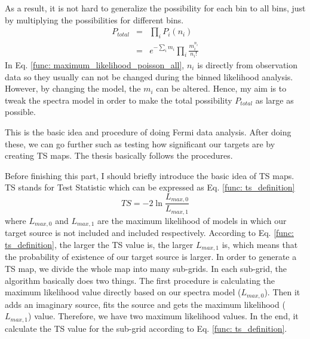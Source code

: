 \documentclass[12pt]{report}
\begin{document}
          As a result, it is not hard to generalize the possibility for each bin to all bins, 
          just by multiplying the possibilities for different bins.
          \begin{eqnarray}
            P_{total} &=& \prod_{i}^{}P_{i}\left(n_{i}\right) \nonumber \\ 
                      &=& e^{-\sum_{i}^{}m_i}\prod_{i}^{}\frac{m_{i}^{n_i}}{n_i!}
            \label{func: maximum_likelihood_poisson_all}
          \end{eqnarray}
          In Eq. \ref{func: maximum_likelihood_poisson_all}, $n_i$ is directly 
          from observation data so they usually can not be changed during the binned likelihood 
          analysis. However, by changing the model, the $m_i$ can be altered. 
          Hence, my aim is to tweak the spectra model in order to make the total possibility 
          $P_{total}$ as large as possible. 

          This is the basic idea and procedure of doing Fermi data analysis. After doing these,
          we can go further such as testing how significant our targets are by creating TS 
          maps. The thesis basically follows the procedures. 

          Before finishing this part, I should briefly introduce the basic idea of TS maps. 
          TS stands for Test Statistic which can be expressed as Eq. \ref{func: ts_definition}
          \begin{equation}
            TS = -2 \ln{\frac{L_{max,0}}{L_{max,1}}}
            \label{func: ts_definition}
          \end{equation}
          where $L_{max,0}$ and $L_{max,1}$ are the maximum likelihood of models in which our 
          target source is not included and included respectively. According to Eq. 
          \ref{func: ts_definition}, the larger the TS value is, the larger $L_{max, 1}$ is, 
          which means that the probability of existence of our target source is larger. 
          In order to generate a TS map, we divide the whole map into many sub-grids. In each 
          sub-grid, the algorithm basically does two things. The first procedure is 
          calculating the maximum likelihood value directly based on our spectra model 
          ($L_{max,0}$). Then it adds an imaginary source, fits the source 
          and gets the maximum likelihood ($L_{max, 1}$) value. Therefore, we have two 
          maximum likelihood values. In the end, it calculate the TS value for the 
          sub-grid according to Eq. \ref{func: ts_definition}. 
\end{document}
